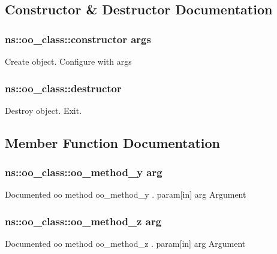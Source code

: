\subsection{Constructor \& Destructor Documentation}
\hypertarget{classns_1_1oo__class_aa26b64151d4b4b0e8b4977aae7048f9b}{
\subsubsection[{constructor}]{\setlength{\rightskip}{0pt plus 5cm}ns\-::oo\-\_\-class\-::constructor {args }
}}\label{classns_1_1oo__class_aa26b64151d4b4b0e8b4977aae7048f9b}
Create object. Configure with args \hypertarget{classns_1_1oo__class_af148cfc1c090a05986c68ac9452a510a}{
\subsubsection[{destructor}]{\setlength{\rightskip}{0pt plus 5cm}ns\-::oo\-\_\-class\-::destructor {}
}}\label{classns_1_1oo__class_af148cfc1c090a05986c68ac9452a510a}
Destroy object. Exit. 

\subsection{Member Function Documentation}
\hypertarget{classns_1_1oo__class_ad07feb192f34010ed66d123338c7acdd}{
\subsubsection[{oo\-\_\-method\-\_\-y}]{\setlength{\rightskip}{0pt plus 5cm}ns\-::oo\-\_\-class\-::oo\-\_\-method\-\_\-y {arg }
\hspace{0.3cm}{\ttfamily [protected]}}}\label{classns_1_1oo__class_ad07feb192f34010ed66d123338c7acdd}
Documented oo method {\ttfamily oo\-\_\-method\-\_\-y} . param\mbox{[}in\mbox{]} arg Argument \hypertarget{classns_1_1oo__class_a8a3cfbae3b3fca463f08adb9174a5fe8}{
\subsubsection[{oo\-\_\-method\-\_\-z}]{\setlength{\rightskip}{0pt plus 5cm}ns\-::oo\-\_\-class\-::oo\-\_\-method\-\_\-z {arg }
}}\label{classns_1_1oo__class_a8a3cfbae3b3fca463f08adb9174a5fe8}
Documented oo method {\ttfamily oo\-\_\-method\-\_\-z} . param\mbox{[}in\mbox{]} arg Argument 

